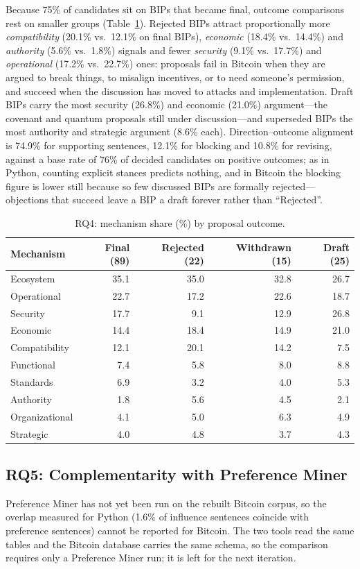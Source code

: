 Because 75\% of candidates sit on BIPs that became final, outcome comparisons rest on smaller groups (Table~\ref{tab:outcomes}). Rejected BIPs attract proportionally more \emph{compatibility} (20.1\% vs.\ 12.1\% on final BIPs), \emph{economic} (18.4\% vs.\ 14.4\%) and \emph{authority} (5.6\% vs.\ 1.8\%) signals and fewer \emph{security} (9.1\% vs.\ 17.7\%) and \emph{operational} (17.2\% vs.\ 22.7\%) ones: proposals fail in Bitcoin when they are argued to break things, to misalign incentives, or to need someone's permission, and succeed when the discussion has moved to attacks and implementation. Draft BIPs carry the most security (26.8\%) and economic (21.0\%) argument---the covenant and quantum proposals still under discussion---and superseded BIPs the most authority and strategic argument (8.6\% each). Direction--outcome alignment is 74.9\% for supporting sentences, 12.1\% for blocking and 10.8\% for revising, against a base rate of 76\% of decided candidates on positive outcomes; as in Python, counting explicit stances predicts nothing, and in Bitcoin the blocking figure is lower still because so few discussed BIPs are formally rejected---objections that succeed leave a BIP a draft forever rather than ``Rejected''.

\begin{table}[t]
\caption{RQ4: mechanism share (\%) by proposal outcome.}
\label{tab:outcomes}
\small
\setlength{\tabcolsep}{4pt}
\begin{tabular}{lrrrr}
\toprule
Mechanism & Final (89) & Rejected (22) & Withdrawn (15) & Draft (25) \\
\midrule
Ecosystem & 35.1 & 35.0 & 32.8 & 26.7 \\
Operational & 22.7 & 17.2 & 22.6 & 18.7 \\
Security & 17.7 & 9.1 & 12.9 & 26.8 \\
Economic & 14.4 & 18.4 & 14.9 & 21.0 \\
Compatibility & 12.1 & 20.1 & 14.2 & 7.5 \\
Functional & 7.4 & 5.8 & 8.0 & 8.8 \\
Standards & 6.9 & 3.2 & 4.0 & 5.3 \\
Authority & 1.8 & 5.6 & 4.5 & 2.1 \\
Organizational & 4.1 & 5.0 & 6.3 & 4.9 \\
Strategic & 4.0 & 4.8 & 3.7 & 4.3 \\
\bottomrule
\end{tabular}
\end{table}

\subsection{RQ5: Complementarity with Preference Miner}

Preference Miner has not yet been run on the rebuilt Bitcoin corpus, so the overlap measured for Python (1.6\% of influence sentences coincide with preference sentences) cannot be reported for Bitcoin. The two tools read the same tables and the Bitcoin database carries the same schema, so the comparison requires only a Preference Miner run; it is left for the next iteration.

